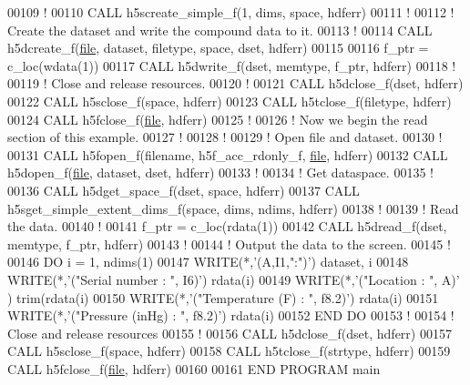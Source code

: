 \begin{DoxyCode}
00109   \textcolor{comment}{!}
00110   \textcolor{keyword}{CALL }h5screate\_simple\_f(1, dims, space, hdferr)
00111   \textcolor{comment}{!}
00112   \textcolor{comment}{! Create the dataset and write the compound data to it.}
00113   \textcolor{comment}{!}
00114   \textcolor{keyword}{CALL }h5dcreate\_f(\hyperlink{structfile}{file}, dataset, filetype, space, dset, hdferr)
00115 
00116   f\_ptr = c\_loc(wdata(1))
00117   \textcolor{keyword}{CALL }h5dwrite\_f(dset, memtype, f\_ptr, hdferr)
00118   \textcolor{comment}{!}
00119   \textcolor{comment}{! Close and release resources.}
00120   \textcolor{comment}{!}
00121   \textcolor{keyword}{CALL }h5dclose\_f(dset, hdferr)
00122   \textcolor{keyword}{CALL }h5sclose\_f(space, hdferr)
00123   \textcolor{keyword}{CALL }h5tclose\_f(filetype, hdferr)
00124   \textcolor{keyword}{CALL }h5fclose\_f(\hyperlink{structfile}{file}, hdferr)
00125   \textcolor{comment}{!}
00126   \textcolor{comment}{! Now we begin the read section of this example.}
00127   \textcolor{comment}{!}
00128   \textcolor{comment}{!}
00129   \textcolor{comment}{! Open file and dataset.}
00130   \textcolor{comment}{!}
00131   \textcolor{keyword}{CALL }h5fopen\_f(filename, h5f\_acc\_rdonly\_f, \hyperlink{structfile}{file}, hdferr)
00132   \textcolor{keyword}{CALL }h5dopen\_f(\hyperlink{structfile}{file}, dataset, dset, hdferr)
00133   \textcolor{comment}{!}
00134   \textcolor{comment}{! Get dataspace.}
00135   \textcolor{comment}{!}
00136   \textcolor{keyword}{CALL }h5dget\_space\_f(dset, space, hdferr)
00137   \textcolor{keyword}{CALL }h5sget\_simple\_extent\_dims\_f(space, dims, ndims, hdferr)
00138   \textcolor{comment}{!}
00139   \textcolor{comment}{! Read the data.}
00140   \textcolor{comment}{!}
00141   f\_ptr = c\_loc(rdata(1))
00142   \textcolor{keyword}{CALL }h5dread\_f(dset, memtype, f\_ptr, hdferr)
00143   \textcolor{comment}{!}
00144   \textcolor{comment}{! Output the data to the screen.}
00145   \textcolor{comment}{!}
00146   \textcolor{keywordflow}{DO} i = 1, ndims(1)
00147      \textcolor{keyword}{WRITE}(*,\textcolor{stringliteral}{'(A,I1,":")'}) dataset, i
00148      \textcolor{keyword}{WRITE}(*,\textcolor{stringliteral}{'("Serial number   : ", I6)'}) rdata(i)%
00149      \textcolor{keyword}{WRITE}(*,\textcolor{stringliteral}{'("Location        : ", A)'} ) trim(rdata(i)%
00150      \textcolor{keyword}{WRITE}(*,\textcolor{stringliteral}{'("Temperature (F) : ", f8.2)'}) rdata(i)%
00151      \textcolor{keyword}{WRITE}(*,\textcolor{stringliteral}{'("Pressure (inHg) : ", f8.2)'}) rdata(i)%
00152 \textcolor{keywordflow}{  END DO}
00153   \textcolor{comment}{!}
00154   \textcolor{comment}{! Close and release resources}
00155   \textcolor{comment}{!}
00156   \textcolor{keyword}{CALL }h5dclose\_f(dset, hdferr)
00157   \textcolor{keyword}{CALL }h5sclose\_f(space, hdferr)
00158   \textcolor{keyword}{CALL }h5tclose\_f(strtype, hdferr)
00159   \textcolor{keyword}{CALL }h5fclose\_f(\hyperlink{structfile}{file}, hdferr)
00160 
00161 \textcolor{keyword}{END PROGRAM }main
\end{DoxyCode}

